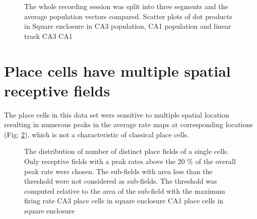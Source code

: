 \begin{figure}[htb!]
\centering
{}
\caption[CA3 Population Vector analysis]{The whole recording session was split into three segments and the average population vectors compared. Scatter plots of dot products in Square enclosure in  CA3 population,  CA1 population and linear track  CA3  CA1}
\label{fig:poolpvchunk}
\end{figure}


\section[Multiple Place fields]{Place cells have multiple spatial receptive fields}

The place cells in this data set were sensitive to multiple spatial location resulting in numerous peaks in the average rate maps at corresponding locations (Fig: \ref{fig:nsubfields}), which is not a characteristic of classical place cells. \\
\begin{figure}[htb!]
\centering
{}
\caption[Multiple receptive fields of Place Cells]{The distribution of number of distinct place fields of a single cells. Only receptive fields with a peak rates above the 20 \% of the overall peak rate were chosen. The sub-fields with area less than the threshold were not considered as sub-fields. The threshold was computed relative to the area of the sub-field with the maximum firing rate  CA3 place cells in square enclosure  CA1 place cells in square enclosure}
\label{fig:nsubfields}
\end{figure}

